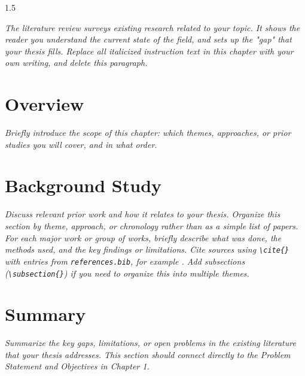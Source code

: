 \begin{spacing}{1.5}
    
\vspace{1cm}

\textit{The literature review surveys existing research related to your topic. It shows the reader you understand the current state of the field, and sets up the "gap" that your thesis fills. Replace all italicized instruction text in this chapter with your own writing, and delete this paragraph.}

\section{Overview}

\textit{Briefly introduce the scope of this chapter: which themes, approaches, or prior studies you will cover, and in what order.}

\section{Background Study}

\textit{Discuss relevant prior work and how it relates to your thesis. Organize this section by theme, approach, or chronology rather than as a simple list of papers. For each major work or group of works, briefly describe what was done, the methods used, and the key findings or limitations. Cite sources using \texttt{\textbackslash cite\{\}} with entries from \texttt{references.bib}, for example \cite{example2024}. Add subsections (\texttt{\textbackslash subsection\{\}}) if you need to organize this into multiple themes.}

\section{Summary}

\textit{Summarize the key gaps, limitations, or open problems in the existing literature that your thesis addresses. This section should connect directly to the Problem Statement and Objectives in Chapter 1.}

\end{spacing}
